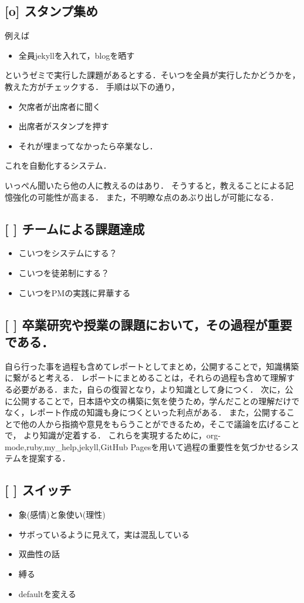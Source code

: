 \documentclass{hissymp}
\begin{document}
\subsection{[o] スタンプ集め}
\label{sec:org3742486}
例えば
\begin{itemize}
\item 全員jekyllを入れて，blogを晒す
\end{itemize}
というゼミで実行した課題があるとする．そいつを全員が実行したかどうかを，教えた方がチェックする．
手順は以下の通り，
\begin{itemize}
\item 欠席者が出席者に聞く
\item 出席者がスタンプを押す
\item それが埋まってなかったら卒業なし．
\end{itemize}
これを自動化するシステム．

いっぺん聞いたら他の人に教えるのはあり．
そうすると，教えることによる記憶強化の可能性が高まる．
また，不明瞭な点のあぶり出しが可能になる．

\subsection{[ ] チームによる課題達成}
\label{sec:orgf929b20}
\begin{itemize}
\item こいつをシステムにする？
\item こいつを徒弟制にする？
\item こいつをPMの実践に昇華する
\end{itemize}
\subsection{[ ] 卒業研究や授業の課題において，その過程が重要である．}
\label{sec:orgcc1312b}
自ら行った事を過程も含めてレポートとしてまとめ，公開することで，知識構築に繋がると考える．
レポートにまとめることは，それらの過程も含めて理解する必要がある．また，自らの復習となり，より知識として身につく．
次に，公に公開することで，日本語や文の構築に気を使うため，学んだことの理解だけでなく，レポート作成の知識も身につくといった利点がある．
また，公開することで他の人から指摘や意見をもらうことができるため，そこで議論を広げることで，
より知識が定着する．
これらを実現するために，org-mode,ruby,my\_help,jekyll,GitHub Pagesを用いて過程の重要性を気づかせるシステムを提案する．

\subsection{[ ] スイッチ}
\label{sec:org24bb85e}
\begin{itemize}
\item 象(感情)と象使い(理性)
\item サボっているように見えて，実は混乱している
\item 双曲性の話
\item 縛る
\item defaultを変える
\end{itemize}
\end{document}
